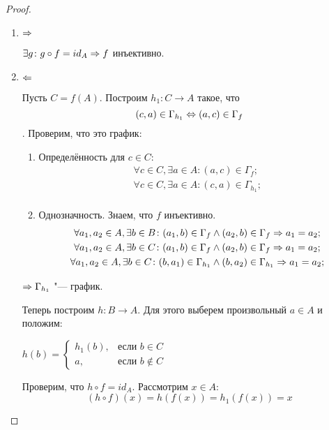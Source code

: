 \begin{proof}
\begin{enumerate}
\item $\Rightarrow$

$\exists g \colon g \circ f = id_A \Rightarrow f$ инъективно.

\item $\Leftarrow$

Пусть $C = f(A)$. Построим $h_1: C \to A$ такое, что
\[(c, a) \in \Gamma_{h_1} \Leftrightarrow (a, c) \in \Gamma_{f}\]. Проверим, что это график:

\begin{enumerate}
\item Определённость для $c \in C$:
\begin{gather*}
\forall c \in C, \exists a \in A \colon (a, c) \in \Gamma_{f}; \\
\forall c \in C, \exists a \in A \colon (c, a) \in \Gamma_{h_1}; \\
\end{gather*}
\item Однозначность. Знаем, что $f$ инъективно. 
\begin{gather*}
\forall a_1, a_2 \in A, \exists b \in B \colon (a_1, b) \in \Gamma_{f} \wedge (a_2, b)\in \Gamma_{f} \Rightarrow a_1 = a_2; \\
\forall a_1, a_2 \in A, \exists b \in C \colon (a_1, b) \in \Gamma_{f} \wedge (a_2, b)\in \Gamma_{f} \Rightarrow a_1 = a_2; \\
\forall a_1, a_2 \in A, \exists b \in C \colon (b, a_1) \in \Gamma_{h_1} \wedge (b, a_2)\in \Gamma_{h_1} \Rightarrow a_1 = a_2;
\end{gather*}
\end{enumerate}

$\Rightarrow \Gamma_{h_1}$ "--- график.

Теперь построим $h: B \to A$. Для этого выберем произвольный $a \in A$ и положим:

$h(b) = \begin{cases} h_1(b), & \text{если~} b \in C\\ a, &\text{если~} b \notin C\end{cases}$

Проверим, что $h \circ f = id_A$. Рассмотрим $x \in A$:
\[(h \circ f)(x) = h(f(x)) = h_1(f(x)) = x\]
\end{enumerate}
\end{proof}

